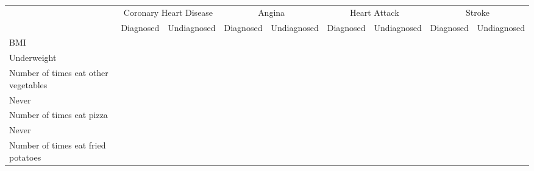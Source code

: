 \documentclass{article}
\begin{document}
\begin{tabular}{lllllllll}
\cline{1-9}
\multicolumn{1}{c}{} &
  \multicolumn{2}{|c}{Coronary Heart Disease} &
  \multicolumn{2}{c}{Angina} &
  \multicolumn{2}{c}{Heart Attack} &
  \multicolumn{2}{c}{Stroke} \\
\multicolumn{1}{c}{} &
  \multicolumn{1}{|r}{Diagnosed} &
  \multicolumn{1}{r}{Undiagnosed} &
  \multicolumn{1}{r}{Diagnosed} &
  \multicolumn{1}{r}{Undiagnosed} &
  \multicolumn{1}{r}{Diagnosed} &
  \multicolumn{1}{r}{Undiagnosed} &
  \multicolumn{1}{r}{Diagnosed} &
  \multicolumn{1}{r}{Undiagnosed} \\
\cline{1-9}
\multicolumn{1}{l}{BMI} &
  \multicolumn{1}{|r}{} &
  \multicolumn{1}{r}{} &
  \multicolumn{1}{r}{} &
  \multicolumn{1}{r}{} &
  \multicolumn{1}{r}{} &
  \multicolumn{1}{r}{} &
  \multicolumn{1}{r}{} &
  \multicolumn{1}{r}{} \\
\multicolumn{1}{l}{\hspace{1em}Underweight} &
  \multicolumn{1}{|r}{} &
  \multicolumn{1}{r}{} &
  \multicolumn{1}{r}{} &
  \multicolumn{1}{r}{} &
  \multicolumn{1}{r}{} &
  \multicolumn{1}{r}{} &
  \multicolumn{1}{r}{} &
  \multicolumn{1}{r}{} \\
\multicolumn{1}{l}{\hspace{2em}Number of times eat other vegetables} &
  \multicolumn{1}{|r}{} &
  \multicolumn{1}{r}{} &
  \multicolumn{1}{r}{} &
  \multicolumn{1}{r}{} &
  \multicolumn{1}{r}{} &
  \multicolumn{1}{r}{} &
  \multicolumn{1}{r}{} &
  \multicolumn{1}{r}{} \\
\multicolumn{1}{l}{\hspace{3em}Never} &
  \multicolumn{1}{|r}{} &
  \multicolumn{1}{r}{} &
  \multicolumn{1}{r}{} &
  \multicolumn{1}{r}{} &
  \multicolumn{1}{r}{} &
  \multicolumn{1}{r}{} &
  \multicolumn{1}{r}{} &
  \multicolumn{1}{r}{} \\
\multicolumn{1}{l}{\hspace{4em}Number of times eat pizza} &
  \multicolumn{1}{|r}{} &
  \multicolumn{1}{r}{} &
  \multicolumn{1}{r}{} &
  \multicolumn{1}{r}{} &
  \multicolumn{1}{r}{} &
  \multicolumn{1}{r}{} &
  \multicolumn{1}{r}{} &
  \multicolumn{1}{r}{} \\
\multicolumn{1}{l}{\hspace{5em}Never} &
  \multicolumn{1}{|r}{} &
  \multicolumn{1}{r}{} &
  \multicolumn{1}{r}{} &
  \multicolumn{1}{r}{} &
  \multicolumn{1}{r}{} &
  \multicolumn{1}{r}{} &
  \multicolumn{1}{r}{} &
  \multicolumn{1}{r}{} \\
\multicolumn{1}{l}{\hspace{6em}Number of times eat fried potatoes} &

\end{tabular}
\end{document}
